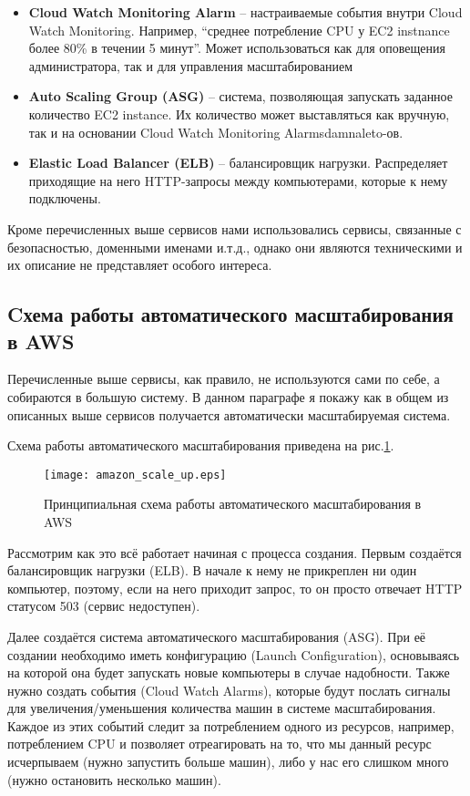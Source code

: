 \begin{itemize}
	\item \textbf{Cloud Watch Monitoring Alarm} -- настраиваемые события внутри Cloud Watch Monitoring. Например, ``среднее потребление CPU у EC2 instnance более 80\% в течении 5 минут''. Может использоваться как для оповещения администратора, так и для управления масштабированием
	\item \textbf{Auto Scaling Group (ASG)} -- система, позволяющая запускать заданное количество EC2 instance. Их количество может выставляться как вручную, так и на основании Cloud Watch Monitoring Alarmsdamnaleto-ов.
	\item \textbf{Elastic Load Balancer (ELB)} -- балансировщик нагрузки. Распределяет приходящие на него HTTP-запросы между компьютерами, которые к нему подключены.
\end{itemize}


Кроме перечисленных выше сервисов нами использовались сервисы, связанные с безопасностью, доменными именами и.т.д., однако они являются техническими и их описание не представляет особого интереса.

\subsection{Cхема работы автоматического масштабирования в AWS}
	Перечисленные выше сервисы, как правило, не используются сами по себе, а собираются в большую систему. В данном параграфе я покажу как в общем из описанных выше сервисов получается автоматически масштабируемая система.
	
	Схема работы автоматического масштабирования приведена на рис.\ref{fig:aws_autoscaling}.
	
\begin{figure}[h]
    \centering
    \texttt{[image: amazon\_scale\_up.eps]} 
    \caption{Принципиальная схема работы автоматического масштабирования в AWS}
    \label{fig:aws_autoscaling}
\end{figure}
	Рассмотрим как это всё работает начиная с процесса создания. Первым создаётся балансировщик нагрузки (ELB). В начале к нему не прикреплен ни один компьютер, поэтому, если на него приходит запрос, то он просто отвечает HTTP статусом 503 (сервис недоступен).
	
	Далее создаётся система автоматического масштабирования (ASG). При её создании необходимо иметь конфигурацию (Launch Configuration), основываясь на которой она будет запускать новые компьютеры в случае надобности. Также нужно создать события (Cloud Watch Alarms), которые будут послать сигналы для увеличения/уменьшения количества машин в системе масштабирования. Каждое из этих событий следит за потреблением одного из ресурсов, например, потреблением CPU и позволяет отреагировать на то, что мы данный ресурс исчерпываем (нужно запустить больше машин), либо у нас его слишком много (нужно остановить несколько машин).
	
